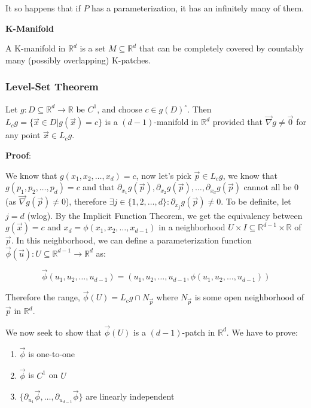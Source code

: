 \documentclass[11 pt, twoside]{article}
\newcommand{\gradient}{\vec{\nabla}}
\begin{document}
It so happens that if $P$ has a parameterization, it has an infinitely many of
them.

\textbf{K-Manifold}

A K-manifold in $\mathbb{R}^d$ is a set $M \subseteq \mathbb{R}^d$ that
can be completely covered by countably many (possibly overlapping) K-patches.

\subsubsection{Level-Set Theorem}

Let $g: D \subseteq \mathbb{R}^d \to \mathbb{R}$ be $C^1$, and choose $c
\in g(D)^\circ$. Then $L_c g = \{\vec{x} \in D | g(\vec{x}) = c\}$ is a $(d
- 1)$-manifold in $\mathbb{R}^d$ provided that $\gradient g \neq \vec{0}$ for any
point $\vec{x} \in L_c g$.

\textbf{Proof}:

We know that $g(x_1, x_2, \dots, x_d) = c$, now let's pick $\vec{p} \in L_c g$,
we know that $g(p_1, p_2, \dots, p_d) = c$ and that $\partial_{x_1} g(\vec{p}),
\partial_{x_2} g(\vec{p}), \dots, \partial_{x_d} g(\vec{p})$ cannot all be 0 (as
$\gradient g(\vec{p}) \neq 0$), therefore $\exists j \in \{1,2,\dots,d\} :
\partial_{x_j} g(\vec{p}) \neq 0$. To be definite, let $j = d$ (wlog). By the
Implicit Function Theorem, we get the equivalency between $g(\vec{x}) = c$ and
$x_d = \phi(x_1, x_2, \dots, x_{d - 1})$ in a neighborhood $U \times I \subseteq
\mathbb{R}^{d - 1} \times \mathbb{R}$ of $\vec{p}$. In this neighborhood,
we can define a parameterization function $\vec{\phi} (\vec{u}) :
U \subseteq \mathbb{R}^{d - 1} \to \mathbb{R}^d$ as: 

\[
\vec{\phi}(u_1, u_2, \dots, u_{d-1}) = (u_1, u_2, \dots, u_{d - 1}, \phi(u_1,
u_2, \dots, u_{d - 1}))
\]

Therefore the range, $\vec{\phi}(U) = L_c g \cap N_{\vec{p}}$ where
$N_{\vec{p}}$ is some open neighborhood of $\vec{p}$ in $\mathbb{R}^d$.

We now seek to show that $\vec{\phi}(U)$ is a $(d-1)$-patch in
$\mathbb{R}^d$. We have to prove:
\begin{enumerate}
\item $\vec{\phi}$ is one-to-one
\item $\vec{\phi}$ is $C^1$ on $U$
\item $\{\partial_{u_1} \vec{\phi}, \dots, \partial_{u_{d - 1}}
\vec{\phi}\}$ are linearly independent
\end{enumerate}
\end{document}
